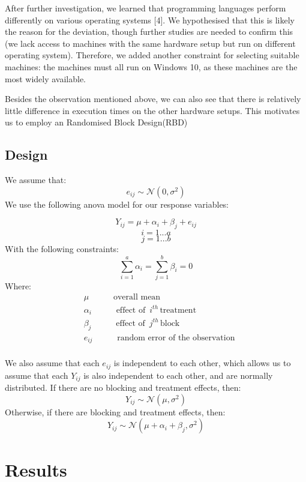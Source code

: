 \documentclass[12pt,halfline,a4paper,]{ouparticle}
\begin{document}
After further investigation, we learned that programming languages
perform differently on various operating systems {[}4{]}. We
hypothesised that this is likely the reason for the deviation, though
further studies are needed to confirm this (we lack access to machines
with the same hardware setup but run on different operating system).
Therefore, we added another constraint for selecting suitable machines:
the machines must all run on Windows 10, as these machines are the most
widely available.

Besides the observation mentioned above, we can also see that there is
relatively little difference in execution times on the other hardware
setups. This motivates us to employ an Randomised Block Design(RBD)

\subsection{Design}\label{design}

We assume that: \[
e_{ij} \sim \mathcal{N}(0, \sigma^2)
\] We use the following anova model for our response variables:

\[
Y_{ij} = \mu + \alpha_i + \beta_j+ e_{ij}
\] \[
i = 1 ...a
\] \[
j = 1 ...b
\] With the following constraints: \[
\sum_{i=1}^a \alpha_i = \sum_{j=1}^b \beta_i =0 
\] Where: \[
\begin{aligned}
&\mu\hspace{35pt}  \text{overall mean} \\
&\alpha_i\hspace{35pt} \text{effect of }\, i^{th}\, \text{treatment}\\
&\beta_j\hspace{35pt} \text{effect of }\, j^{th}\, \text{block}\\
&e_{ij}\hspace{35pt} \text{random error of the observation}\\
\end{aligned}
\]

We also assume that each \(e_{ij}\) is independent to each other, which
allows us to assume that each \(Y_{ij}\) is also independent to each
other, and are normally distributed. If there are no blocking and
treatment effects, then: \[
Y_{ij} \sim \mathcal{N}(\mu, \sigma^2)
\] Otherwise, if there are blocking and treatment effects, then: \[
Y_{ij} \sim \mathcal{N}(\mu + \alpha_i + \beta_j, \sigma^2)
\]

\newpage

\section{Results}\label{results}
\end{document}
